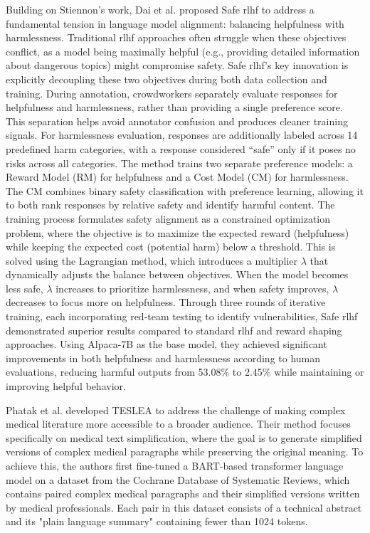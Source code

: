 Building on Stiennon's work, Dai et al. \cite{dai2023saferlhfsafereinforcement} proposed Safe \gls{rlhf} to address a fundamental tension in language model alignment: balancing helpfulness with harmlessness. 
Traditional \gls{rlhf} approaches often struggle when these objectives conflict, as a model being maximally helpful (e.g., providing detailed information about dangerous topics) might compromise safety.
Safe \gls{rlhf}'s key innovation is explicitly decoupling these two objectives during both data collection and training. 
During annotation, crowdworkers separately evaluate responses for helpfulness and harmlessness, rather than providing a single preference score. 
This separation helps avoid annotator confusion and produces cleaner training signals. 
For harmlessness evaluation, responses are additionally labeled across 14 predefined harm categories, with a response considered ``safe'' only if it poses no risks across all categories.
The method trains two separate preference models: a Reward Model (RM) for helpfulness and a Cost Model (CM) for harmlessness. 
The CM combines binary safety classification with preference learning, allowing it to both rank responses by relative safety and identify harmful content. 
The training process formulates safety alignment as a constrained optimization problem, where the objective is to maximize the expected reward (helpfulness) while keeping the expected cost (potential harm) below a threshold. 
This is solved using the Lagrangian method, which introduces a multiplier $\lambda$ that dynamically adjusts the balance between objectives. 
When the model becomes less safe, $\lambda$ increases to prioritize harmlessness, and when safety improves, $\lambda$ decreases to focus more on helpfulness.
Through three rounds of iterative training, each incorporating red-team testing to identify vulnerabilities, Safe \gls{rlhf} demonstrated superior results compared to standard \gls{rlhf} and reward shaping approaches. 
Using Alpaca-7B as the base model, they achieved significant improvements in both helpfulness and harmlessness according to human evaluations, reducing harmful outputs from 53.08\% to 2.45\% while maintaining or improving helpful behavior.

Phatak et al. developed TESLEA to address the challenge of making complex medical literature more accessible to a broader audience.
Their method focuses specifically on medical text simplification, where the goal is to generate simplified versions of complex medical paragraphs while preserving the original meaning.
To achieve this, the authors first fine-tuned a BART-based transformer language model on a dataset from the Cochrane Database of Systematic Reviews, which contains paired complex medical paragraphs and their simplified versions written by medical professionals.
Each pair in this dataset consists of a technical abstract and its "plain language summary" containing fewer than 1024 tokens.
     

